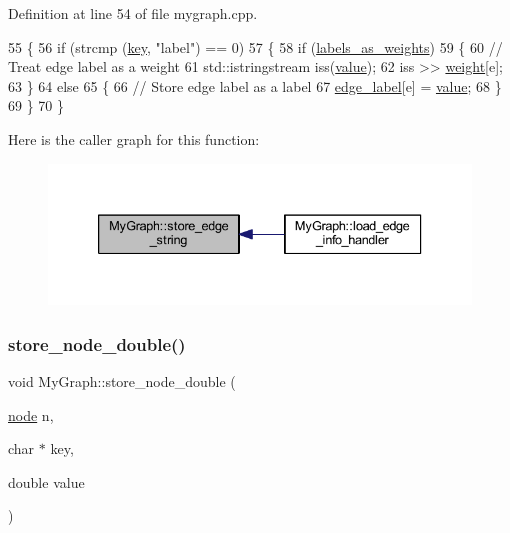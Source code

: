 Definition at line 54 of file mygraph.\+cpp.


\begin{DoxyCode}
55 \{
56     \textcolor{keywordflow}{if} (strcmp (\mbox{\hyperlink{struct_g_m_l__pair_a00e5de36c09fef63b8d439b4341f0655}{key}}, \textcolor{stringliteral}{"label"}) == 0)
57     \{
58         \textcolor{keywordflow}{if} (\mbox{\hyperlink{class_my_graph_a1c451264db5a154029533d9368b90317}{labels\_as\_weights}})
59         \{
60             \textcolor{comment}{// Treat edge label as a weight}
61             std::istringstream iss(\mbox{\hyperlink{struct_g_m_l__pair_aef8797e7d2fc0d2e2f628ce9c2783a6c}{value}});
62             iss >> \mbox{\hyperlink{class_my_graph_aa6e12f16153220780e9db1eb30112b34}{weight}}[e];
63         \}
64         \textcolor{keywordflow}{else}
65         \{
66             \textcolor{comment}{// Store edge label as a label}
67             \mbox{\hyperlink{class_my_graph_ac87b3f22352ddc7ec3864173a0d69cdd}{edge\_label}}[e] = \mbox{\hyperlink{struct_g_m_l__pair_aef8797e7d2fc0d2e2f628ce9c2783a6c}{value}};
68         \}
69     \}
70 \}
\end{DoxyCode}
Here is the caller graph for this function\+:
\nopagebreak
\begin{figure}[H]
\begin{center}
\leavevmode
\includegraphics[width=333pt]{class_my_graph_a3f10b4d50b97fc6f33a767e9db7fdd8b_icgraph}
\end{center}
\end{figure}
\mbox{\label{class_my_graph_a16b037dbb0011fc50367145c477ac7a4}} 
\subsubsection{\texorpdfstring{store\+\_\+node\+\_\+double()}{store\_node\_double()}}
{\footnotesize\ttfamily void My\+Graph\+::store\+\_\+node\+\_\+double (\begin{DoxyParamCaption}\item[{\mbox{\hyperlink{classnode}{node}}}]{n,  }\item[{char $\ast$}]{key,  }\item[{double}]{value }\end{DoxyParamCaption})\hspace{0.3cm}{\ttfamily [virtual]}}



